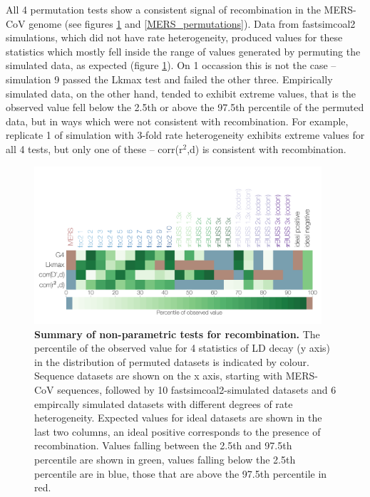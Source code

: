 \documentclass[11pt,oneside,letterpaper]{article}
\begin{document}
All 4 permutation tests show a consistent signal of recombination in the MERS-CoV genome (see figures \ref{permutations} and \ref{MERS_permutations}).
Data from fastsimcoal2 simulations, which did not have rate heterogeneity, produced values for these statistics which mostly fell inside the range of values generated by permuting the simulated data, as expected (figure \ref{permutations}).
On 1 occassion this is not the case -- simulation 9 passed the Lkmax test and failed the other three.
Empirically simulated data, on the other hand, tended to exhibit extreme values, that is the observed value fell below the 2.5th or above the 97.5th percentile of the permuted data, but in ways which were not consistent with recombination.
For example, replicate 1 of simulation with 3-fold rate heterogeneity exhibits extreme values for all 4 tests, but only one of these -- corr(r$^{2}$,d) is consistent with recombination.

\begin{figure}[h]
	\centering
	\includegraphics[width=0.95\textwidth]{figures/MERS_LDhat_permutations_summary.png}
	\caption{\textbf{Summary of non-parametric tests for recombination.}
The percentile of the observed value for 4 statistics of LD decay (y axis) in the distribution of permuted datasets is indicated by colour.
Sequence datasets are shown on the x axis, starting with MERS-CoV sequences, followed by 10 fastsimcoal2-simulated datasets and 6 empircally simulated datasets with different degrees of rate heterogeneity.
Expected values for ideal datasets are shown in the last two columns, an ideal positive corresponds to the presence of recombination.
Values falling between the 2.5th and 97.5th percentile are shown in green, values falling below the 2.5th percentile are in blue, those that are above the 97.5th percentile in red.}
	\label{permutations}
\end{figure}
\end{document}
